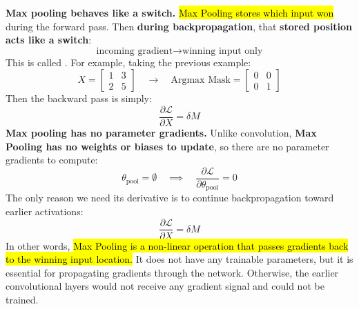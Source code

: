 \highspace
\textcolor{Green3}{ \textbf{Max pooling behaves like a switch.}} \hl{Max Pooling stores which input won} during the forward pass. Then \textbf{during backpropagation}, that \textbf{stored position acts like a switch}:
\begin{equation*}
    \text{incoming gradient} \to \text{winning input only}
\end{equation*}
This is called . For example, taking the previous example:
\begin{equation*}
    X=
    \begin{bmatrix}
        1 & 3\\
        2 & 5
    \end{bmatrix}
    \quad \longrightarrow \quad
    \text{Argmax Mask} =
    \begin{bmatrix}
        0 & 0\\
        0 & 1
    \end{bmatrix}
\end{equation*}
Then the backward pass is simply:
\begin{equation*}
    \frac{\partial\mathcal L}{\partial X} =
    \delta M
\end{equation*}
\textcolor{Green3}{ \textbf{Max pooling has no parameter gradients.}} Unlike convolution, \textbf{Max Pooling has no weights or biases to update}, so there are no parameter gradients to compute:
\begin{equation*}
    \theta_{\text{pool}} = \emptyset \quad \implies \quad \frac{\partial\mathcal L}{\partial \theta_{\text{pool}}} = 0
\end{equation*}
The only reason we need its derivative is to continue backpropagation toward earlier activations:
\begin{equation*}
    \frac{\partial\mathcal L}{\partial X} = \delta M
\end{equation*}
In other words, \hl{Max Pooling is a non-linear operation that passes gradients back to the winning input location.} It does not have any trainable parameters, but it is essential for propagating gradients through the network. Otherwise, the earlier convolutional layers would not receive any gradient signal and could not be trained.

